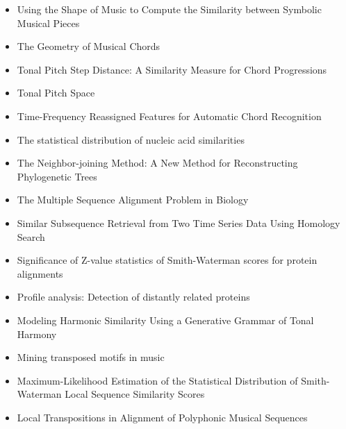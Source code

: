 \begin{itemize}
\item Using the Shape of Music to Compute the Similarity between Symbolic Musical Pieces \cite{urbano2010using}
\item The Geometry of Musical Chords \cite{Tymoczko_2006}
\item Tonal Pitch Step Distance: A Similarity Measure for Chord Progressions \cite{de2008tonal}
\item Tonal Pitch Space \cite{lerdahl1988tonal}
\item Time-Frequency Reassigned Features for Automatic Chord Recognition \cite{khadkevich2011time}
\item The statistical distribution of nucleic acid similarities \cite{smith1985statistical}
\item The Neighbor-joining Method: A New Method for Reconstructing Phylogenetic Trees \cite{saitou1987neighbor}
\item The Multiple Sequence Alignment Problem in Biology \cite{carrillo1988multiple}
\item Similar Subsequence Retrieval from Two Time Series Data Using Homology Search \cite{nishii2010similar}
\item Significance of Z-value statistics of Smith-Waterman scores for protein alignments \cite{comet1999significance}
\item Profile analysis: Detection of distantly related proteins \cite{gribskov1987profile}
\item Modeling Harmonic Similarity Using a Generative Grammar of Tonal Harmony \cite{de2009modeling}
\item Mining transposed motifs in music \cite{jimenez2011mining}
\item Maximum-Likelihood Estimation of the Statistical Distribution of Smith-Waterman Local Sequence Similarity Scores \cite{mott1992maximum}
\item Local Transpositions in Alignment of Polyphonic Musical Sequences
\end{itemize}